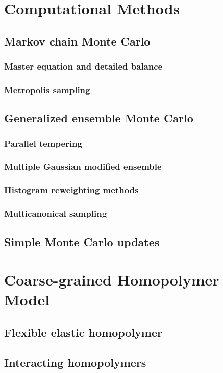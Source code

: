 \documentclass[12pt]{report}
\begin{document}
\chapter{Computational Methods}
\section{Markov chain Monte Carlo}
\subsection{Master equation and detailed balance}
\subsection{Metropolis sampling}
\section{Generalized ensemble Monte Carlo}
\subsection{Parallel tempering}
\subsection{Multiple Gaussian modified ensemble}
\subsection{Histogram reweighting methods}
\subsection{Multicanonical sampling}
\section{Simple Monte Carlo updates}

\chapter{Coarse-grained Homopolymer Model}
\section{Flexible elastic homopolymer}
\section{Interacting homopolymers}
\end{document}
